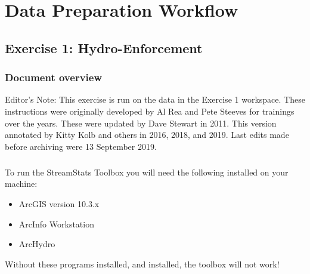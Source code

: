 \documentclass[letterpaper,10pt,english]{sphinxmanual}
\begin{document}
\section{Data Preparation Workflow}
\label{\detokenize{workflow:data-preparation-workflow}}\label{\detokenize{workflow::doc}}

\subsection{Exercise 1: Hydro-Enforcement}
\label{\detokenize{ex_1:exercise-1-hydro-enforcement}}\label{\detokenize{ex_1::doc}}

\subsubsection{Document overview}
\label{\detokenize{ex_1:document-overview}}
Editor’s Note: This exercise is run on the data in the Exercise 1 workspace. These instructions were originally developed by Al Rea and Pete Steeves for trainings over the years. These were updated by Dave Stewart in 2011. This version annotated by Kitty Kolb and others in 2016, 2018, and 2019. Last edits made before archiving were 13 September 2019.


\paragraph{}
\label{\detokenize{ex_1:step-0-preparation}}

\subparagraph{}
\label{\detokenize{ex_1:check-equipment}}
To run the StreamStats Toolbox you will need the following installed on your machine:
\begin{itemize}
\item {} 
ArcGIS version 10.3.x

\item {} 
ArcInfo Workstation

\item {} 
ArcHydro

\end{itemize}

Without these programs installed, and  installed, the toolbox will not work!


\subparagraph{}
\label{\detokenize{ex_1:obtain-necessary-data}}
\end{document}
